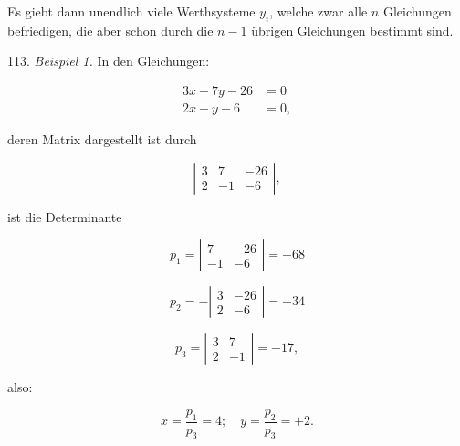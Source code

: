Es giebt dann unendlich viele Werthsysteme $y_i$, welche zwar alle $n$ Gleichungen befriedigen, die aber schon durch die $n-1$ übrigen Gleichungen bestimmt sind.

113. \textit{Beispiel 1.} In den Gleichungen:

\[ \begin{aligned} 3x+7y-26&=0\\ 2x-y-6&=0, \end{aligned} \]

deren Matrix dargestellt ist durch

\[ \left| \begin{array}{ccc} 3 & 7 & -26 \\ 2 & -1 & -6 \end{array} \right|, \]

ist die Determinante

\[ p_1 = \left| \begin{array}{cc} 7 & -26\\ -1 & -6 \end{array} \right| = -68 \]

\[ p_2 = -\left| \begin{array}{cc} 3 & -26\\ 2 & -6 \end{array} \right| = -34 \]

\[ p_3 = \left| \begin{array}{cc} 3 & 7\\ 2 & -1 \end{array} \right| = -17, \]

also:

\[ x=\frac{p_1}{p_3}=4;\quad y=\frac{p_2}{p_3}=+2. \]



